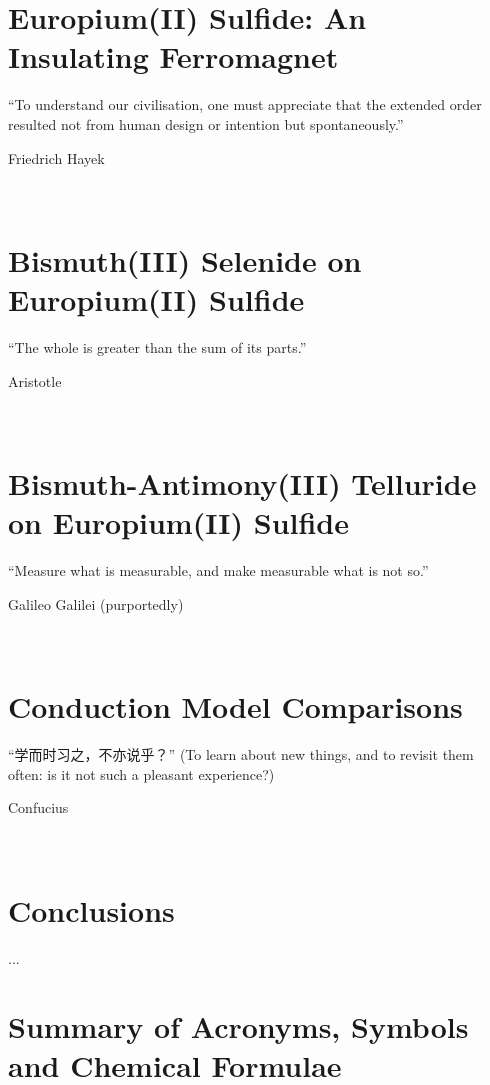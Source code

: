 ﻿\documentclass{report}
\begin{document}
\chapter{Europium(II) Sulfide: An Insulating Ferromagnet}\label{ch:EuS}
\begin{refsection}
\epigraph{``To understand our civilisation, one must appreciate that the extended order resulted not from human design or intention but spontaneously.''}{Friedrich Hayek}~\\
    
    \printbibliography[heading=subbibintoc, title=References for Chapter~\ref{ch:EuS}]
\end{refsection} 

\chapter{Bismuth(III) Selenide on Europium(II) Sulfide}\label{ch:bilayer2014}
\begin{refsection} 
\epigraph{``The whole is greater than the sum of its parts.''}{Aristotle}~\\
    
    \printbibliography[heading=subbibintoc, title=References for Chapter~\ref{ch:bilayer2014}]
\end{refsection} 

\chapter{Bismuth-Antimony(III) Telluride on Europium(II) Sulfide}\label{ch:bilayer2018}
\begin{refsection}
\epigraph{``Measure what is measurable, and make measurable what is not so.''}{Galileo Galilei (purportedly)}~\\
    
    \printbibliography[heading=subbibintoc, title=References for Chapter~\ref{ch:bilayer2018}]
\end{refsection}

\chapter{Conduction Model Comparisons}\label{ch:models}
\begin{refsection}
    \begin{CJK*}{UTF8}{gkai}
    \epigraph{``学而时习之，不亦说乎？'' (To learn about new things, and to revisit them often: is it not such a pleasant experience?)}{Confucius}~\\
    \end{CJK*}
    
    \printbibliography[heading=subbibintoc, title=References for Chapter~\ref{ch:models}]
\end{refsection}

\chapter{Conclusions}
\label{ch:conclusions}
     ...
\appendix
%
%
\chapter{Summary of Acronyms, Symbols and Chemical Formulae}
    
\end{document}
